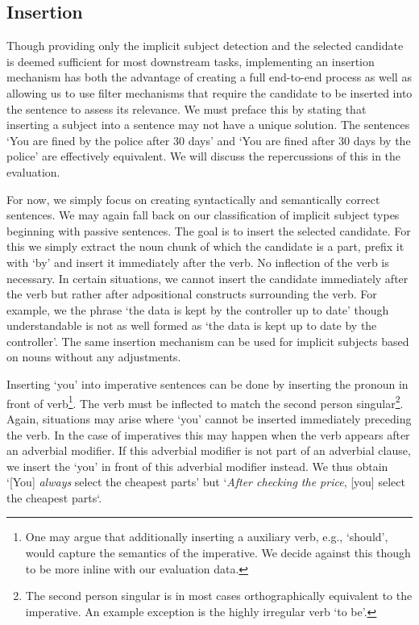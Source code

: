 \documentclass[times, 10pt,twocolumn]{article}
\begin{document}
\subsection{Insertion}\label{insertion}
Though providing only the implicit subject detection and the selected candidate is deemed sufficient for most
downstream tasks, implementing an insertion mechanism has both the advantage of creating a full end-to-end
process as well as allowing us to use filter mechanisms that require the candidate to be inserted into
the sentence to assess its relevance. We must preface this by stating that inserting a subject into
a sentence may not have a unique solution.
The sentences `You are fined by the police after 30 days' and `You are fined after 30 days by the police'
are effectively equivalent.
We will discuss the repercussions of this in the evaluation.

For now, we simply focus on creating syntactically and semantically correct sentences. We may again fall
back on our classification of implicit subject types beginning with passive sentences. The goal is
to insert the selected candidate. For this we simply extract the noun chunk of which the candidate is
a part, prefix it with `by' and insert it immediately after the verb. No inflection of the verb is necessary.
In certain situations, we cannot insert the candidate immediately after the verb but rather after
adpositional constructs surrounding the verb. For example, we the phrase
`the data is kept by the controller up to date' though understandable is not as well formed as
`the data is kept up to date by the controller'.
The same insertion mechanism can be used for implicit subjects based on nouns without any adjustments.

Inserting `you' into imperative sentences can be done by inserting the pronoun in front of
verb\footnote{One may argue that additionally inserting a auxiliary verb, e.g., `should',
would capture the semantics of the imperative. We decide against this though to be more inline
with our evaluation data.}. The verb must be inflected to match the second person singular\footnote{The second person
singular is in most cases orthographically equivalent to the imperative. An example exception
is the highly irregular verb `to be'.}. Again, situations may arise where `you' cannot be inserted
immediately preceding the verb. In the case of imperatives this may happen when the verb
appears after an adverbial modifier. If this adverbial modifier is not part of an adverbial clause,
we insert the `you' in front of this adverbial modifier instead. We thus obtain
`[You] \textit{always} select the cheapest parts' but
`\textit{After checking the price}, [you] select the cheapest parts`.
\end{document}
